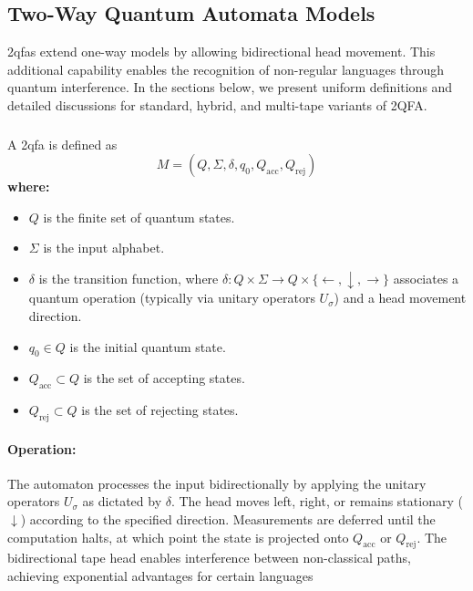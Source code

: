 \subsection{Two-Way Quantum Automata Models}
\label{sec:two-way-qfas}
\glspl{2qfa} extend one-way models by allowing bidirectional head movement. This additional capability enables the recognition of non-regular languages through quantum interference. In the sections below, we present uniform definitions and detailed discussions for standard, hybrid, and multi-tape variants of 2QFA.

\subsubsection{}
\label{subsec:2qfa}
\begin{definition}
A \gls{2qfa} is defined as 
\[
M = (Q, \Sigma, \delta, q_0, Q_{\text{acc}}, Q_{\text{rej}})
\]
\textbf{where:}
\begin{itemize}
    \item \( Q \) is the finite set of quantum states.
    \item \( \Sigma \) is the input alphabet.
    \item \( \delta \) is the transition function, where \(\delta: Q \times \Sigma \to Q \times \{\leftarrow, \downarrow, \rightarrow\}\) associates a quantum operation (typically via unitary operators \( U_\sigma \)) and a head movement direction.
    \item \( q_0 \in Q \) is the initial quantum state.
    \item \( Q_{\text{acc}} \subset Q \) is the set of accepting states.
    \item \( Q_{\text{rej}} \subset Q \) is the set of rejecting states.
\end{itemize}
\end{definition}

\paragraph{Operation:}  
The automaton processes the input bidirectionally by applying the unitary operators \( U_\sigma \) as dictated by \( \delta \). The head moves left, right, or remains stationary (\(\downarrow\)) according to the specified direction. Measurements are deferred until the computation halts, at which point the state is projected onto \( Q_{\text{acc}} \) or \( Q_{\text{rej}} \).
The bidirectional tape head enables interference between non-classical paths, achieving exponential advantages for certain languages

